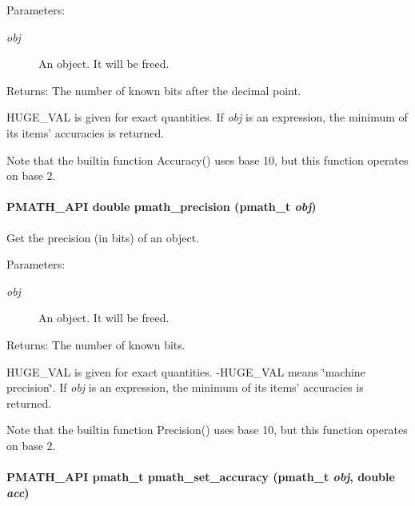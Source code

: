 \begin{Desc}
\item[Parameters:]
\begin{description}
\item[{\em obj}]An object. It will be freed. \end{description}
\end{Desc}
\begin{Desc}
\item[Returns:]The number of known bits after the decimal point.\end{Desc}
HUGE\_\-VAL is given for exact quantities. If {\em obj\/} is an expression, the minimum of its items' accuracies is returned.

Note that the builtin function Accuracy() uses base 10, but this function operates on base 2. \hypertarget{group__numbers_g8c708b70a1cb0904900187f0c149ab7b}{
\paragraph[{pmath\_\-precision}]{\setlength{\rightskip}{0pt plus 5cm}PMATH\_\-API double pmath\_\-precision ({\bf pmath\_\-t} {\em obj})}\hfill}
\label{group__numbers_g8c708b70a1cb0904900187f0c149ab7b}


Get the precision (in bits) of an object. 

\begin{Desc}
\item[Parameters:]
\begin{description}
\item[{\em obj}]An object. It will be freed. \end{description}
\end{Desc}
\begin{Desc}
\item[Returns:]The number of known bits.\end{Desc}
HUGE\_\-VAL is given for exact quantities. -HUGE\_\-VAL means \char`\"{}machine precision\char`\"{}. If {\em obj\/} is an expression, the minimum of its items' accuracies is returned.

Note that the builtin function Precision() uses base 10, but this function operates on base 2. \hypertarget{group__numbers_g58e3c6cb9f505bb6c4544dd54de719f0}{
\paragraph[{pmath\_\-set\_\-accuracy}]{\setlength{\rightskip}{0pt plus 5cm}PMATH\_\-API {\bf pmath\_\-t} pmath\_\-set\_\-accuracy ({\bf pmath\_\-t} {\em obj}, \/  double {\em acc})}\hfill}
\label{group__numbers_g58e3c6cb9f505bb6c4544dd54de719f0}


